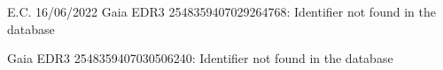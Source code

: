E.C. 16/06/2022
Gaia EDR3 2548359407029264768: Identifier not found in the database

Gaia EDR3 2548359407030506240: Identifier not found in the database
